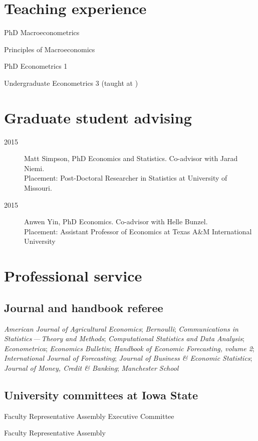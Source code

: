 \documentclass[11pt]{article}%
\newcommand{\allcaps}[1]{\textls[30]{\MakeUppercase{#1}}}
\begin{document}
\section*{Teaching experience}
\begin{description}[noitemsep]
\item[2011\,--\,present] PhD Macroeconometrics
\item[2010\,--\,present] Principles of Macroeconomics
\item[2009\,--\,present] PhD Econometrics 1
\item[2009] Undergraduate Econometrics 3 (taught at \allcaps{UCSD})
\end{description}

\section*{Graduate student advising}
\begin{description}
\item[2015] Matt Simpson, PhD Economics and Statistics.  Co-advisor
with Jarad Niemi. \\
Placement: Post-Doctoral Researcher in Statistics at University of Missouri.
\item[2015] Anwen Yin, PhD Economics. Co-advisor with Helle Bunzel. \\
Placement: Assistant Professor of Economics at Texas A\&M
International University
\end{description}

\section*{Professional service}

\subsection*{Journal and handbook referee}
\textit{American Journal of Agricultural Economics};
\textit{Bernoulli};
\textit{Communications in Statistics\,---\,Theory and Methods};
\textit{Computational Statistics and Data Analysis};
\textit{Econometrica};
\textit{Economics Bulletin};
\textit{Handbook of Economic Forecasting, volume 2};
\textit{International Journal of Forecasting};
\textit{Journal of Business \& Economic Statistics};
\textit{Journal of Money, Credit \& Banking};
\textit{Manchester School}

\subsection*{University committees at Iowa State}
\begin{description}[noitemsep]
\item[2014\,--\,present] Faculty Representative Assembly Executive
Committee
\item[2013\,--\,present] Faculty Representative Assembly
\end{description}
\end{document}
